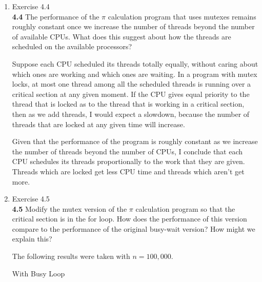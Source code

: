 \documentclass[11pt,epsfig,letterpaper]{article}
\begin{document}
\begin{enumerate}
            \item Exercise 4.4 \\
            {\bf 4.4}\>\> The performance of the $\pi$ calculation program that uses mutexes remains roughly constant once we increase the number of threads beyond the number of available CPUs. What does this suggest about how the threads are scheduled on the available processors?
            \vspace{0.5pc}

            \quad Suppose each CPU scheduled its threads totally equally, without caring about which ones are working and which ones are waiting. In a program with mutex locks, at most one thread among all the scheduled threads is running over a critical section at any given moment. If the CPU gives equal priority to the thread that is locked as to the thread that is working in a critical section, then as we add threads, I would expect a slowdown, because the number of threads that are locked at any given time will increase.

            \quad Given that the performance of the program is roughly constant as we increase the number of threads beyond the number of CPUs, I conclude that each CPU schedules its threads proportionally to the work that they are given. Threads which are locked get less CPU time and threads which aren't get more.

            \item Exercise 4.5 \\
            {\bf 4.5}\>\> Modify the mutex version of the $\pi$ calculation program so that the critical section is in the for loop. How does the performance of this version compare to the performance of the original busy-wait version? How might we explain this?
            \vspace{0.5pc}

            \quad The following results were taken with $n = 100,000$.

            \begin{center}

            With Busy Loop


\end{center}
\end{enumerate}
\end{document}

